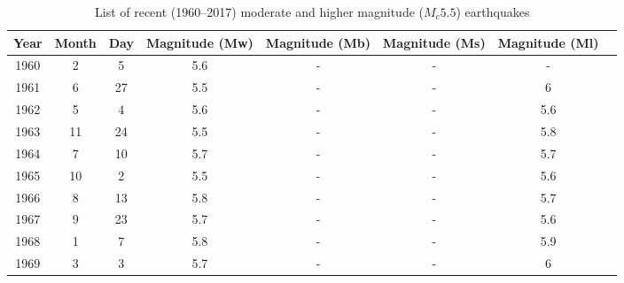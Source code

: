 
\begin{table}[h]
\centering
\caption{List of recent (1960–2017) moderate and higher magnitude (\(M_c 5.5\)) earthquakes}
\label{tab:2.1}
\begin{tabular}{|c|c|c|c|c|c|c|c|}
\hline
Year & Month & Day & Magnitude (Mw) & Magnitude (Mb) & Magnitude (Ms) & Magnitude (Ml) \\ \hline
1960 & 2  & 5  & 5.6 & - & - & - \\ \hline
1961 & 6  & 27 & 5.5 & - & - & 6 \\ \hline
1962 & 5  & 4  & 5.6 & - & - & 5.6 \\ \hline
1963 & 11 & 24 & 5.5 & - & - & 5.8 \\ \hline
1964 & 7  & 10 & 5.7 & - & - & 5.7 \\ \hline
1965 & 10 & 2  & 5.5 & - & - & 5.6 \\ \hline
1966 & 8  & 13 & 5.8 & - & - & 5.7 \\ \hline
1967 & 9  & 23 & 5.7 & - & - & 5.6 \\ \hline
1968 & 1  & 7  & 5.8 & - & - & 5.9 \\ \hline
1969 & 3  & 3  & 5.7 & - & - & 6 \\ \hline
\end{tabular}
\end{table}

\restoregeometry
